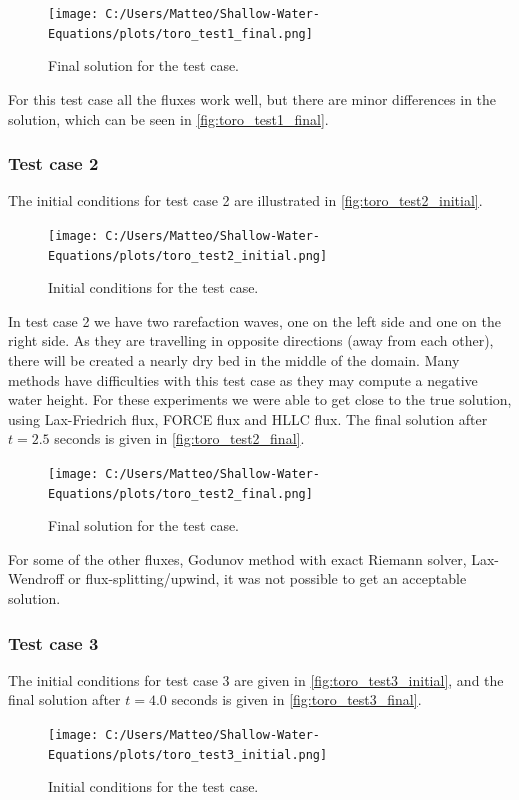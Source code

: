 \begin{figure}[H]
    \centering
    \texttt{[image: C:/Users/Matteo/Shallow-Water-Equations/plots/toro\_test1\_final.png]}
    \caption{Final solution for the test case.}\label{fig:toro_test1_final}
\end{figure}
For this test case all the fluxes work well, but there are minor differences in the solution, which can be seen in \autoref{fig:toro_test1_final}.

\subsubsection*{Test case 2}
The initial conditions for test case 2 are illustrated in \autoref{fig:toro_test2_initial}.
\begin{figure}[H]
    \centering
    \texttt{[image: C:/Users/Matteo/Shallow-Water-Equations/plots/toro\_test2\_initial.png]}
    \caption{Initial conditions for the test case.}\label{fig:toro_test2_initial}
\end{figure}
In test case 2 we have two rarefaction waves, one on the left side and one on the right side.
As they are travelling in opposite directions (away from each other), there will be created a nearly dry bed in the middle of the domain.
Many methods have difficulties with this test case as they may compute a negative water height.
For these experiments we were able to get close to the true solution, using Lax-Friedrich flux, FORCE flux and HLLC flux.
The final solution after $t=2.5$ seconds is given in \autoref{fig:toro_test2_final}.

\begin{figure}[H]
    \centering
    \texttt{[image: C:/Users/Matteo/Shallow-Water-Equations/plots/toro\_test2\_final.png]}
    \caption{Final solution for the test case.}\label{fig:toro_test2_final}
\end{figure}
For some of the other fluxes, Godunov method with exact Riemann solver, Lax-Wendroff or flux-splitting/upwind, it was not possible to get an acceptable solution.

\subsubsection*{Test case 3}
The initial conditions for test case 3 are given in \autoref{fig:toro_test3_initial}, and the final solution after $t=4.0$ seconds is given in \autoref{fig:toro_test3_final}.
\begin{figure}[H]
    \centering
    \texttt{[image: C:/Users/Matteo/Shallow-Water-Equations/plots/toro\_test3\_initial.png]}
    \caption{Initial conditions for the test case.}\label{fig:toro_test3_initial}
\end{figure}

